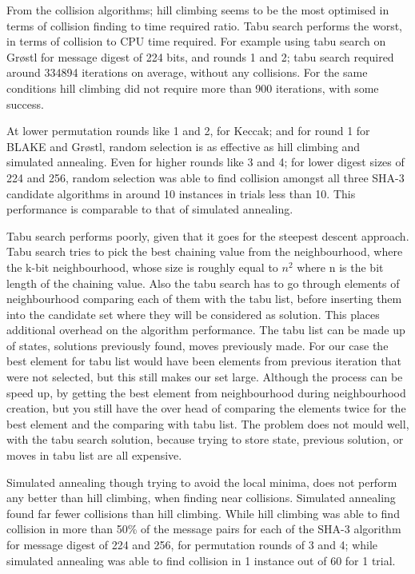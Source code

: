 From the collision algorithms; hill climbing seems to be the most optimised in terms of collision finding to time required
ratio. Tabu search performs the worst, in terms of collision to CPU time required. For example using tabu search on 
Gr{\o}stl for message digest of 224 bits, and rounds 1 and 2; tabu search required around 334894 iterations on average,
without any collisions. For the same conditions hill climbing did not require more than 900 iterations, with some success.

At lower permutation rounds like 1 and 2, for Keccak; and for round 1 for BLAKE and Gr{\o}stl, random selection is as 
effective as hill climbing and simulated annealing. Even for higher rounds like 3 and 4; for lower digest sizes of 224
and 256, random selection was able to find collision amongst all three SHA-3 candidate algorithms in around 10 instances 
in trials less than 10. This performance is comparable to that of simulated annealing.

Tabu search performs poorly, given that it goes for the steepest descent approach. Tabu search tries to pick the best 
chaining value from the neighbourhood, where the k-bit neighbourhood, whose size is roughly equal to $n^{2}$ where n
is the bit length of the chaining value. Also the tabu search has to go through elements of neighbourhood comparing each
of them with the tabu list, before inserting them into the candidate set where they will be considered as solution.
This places additional overhead on the algorithm performance. The tabu list can be made up of states, solutions previously
found, moves previously made. For our case the best element for tabu list would have been elements from previous iteration
that were not selected, but this still makes our set large. Although the process can be speed up, by getting the best
element from neighbourhood during neighbourhood creation, but you still have the over head of comparing the elements
twice for the best element and the comparing with tabu list. The problem does not mould well, with the tabu search
solution, because trying to store state, previous solution, or moves in tabu list are all expensive.

Simulated annealing though trying to avoid the local minima, does not perform any better than hill climbing, when finding
near collisions. Simulated annealing found far fewer collisions
than hill climbing. While hill climbing was able to find collision in more than 50\% of the message
pairs for each of the SHA-3 algorithm for message digest of 224 and 256, for permutation rounds of 3 and 4; while 
simulated annealing was able to find collision in 1 instance out of 60 for 1 trial.

